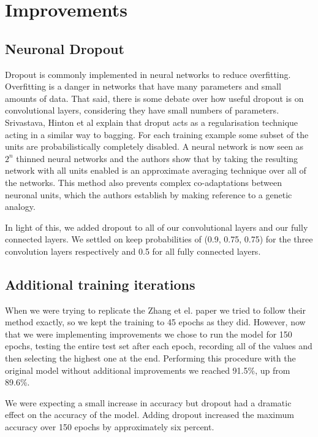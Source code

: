 \documentclass[conference]{IEEEtran}
\begin{document}
\section{Improvements}

\subsection{Neuronal Dropout}

Dropout is commonly implemented in neural networks to reduce overfitting. Overfitting is a danger in networks that have many parameters and small amounts of data. That said, there is some debate over how useful dropout is on convolutional layers, considering they have small numbers of parameters. Srivastava, Hinton et al\cite{Dropout_Paper} explain that droput acts as a regularisation technique acting in a similar way to bagging. For each training example some subset of the units are probabilistically completely disabled. A neural network is now seen as $2^{n}$ thinned neural networks and the authors show that by taking the resulting network with all units enabled is an approximate averaging technique over all of the networks. This method also prevents complex co-adaptations between neuronal units, which the authors establish by making reference to a genetic analogy.

In light of this, we added dropout to all of our convolutional layers and our fully connected layers. We settled on keep probabilities of (0.9, 0.75, 0.75) for the three convolution layers respectively and 0.5 for all fully connected layers.

\subsection{Additional training iterations}

When we were trying to replicate the Zhang et el. paper we tried to follow their method exactly, so we kept the training to 45 epochs as they did. However, now that we were implementing improvements we chose to run the model for 150 epochs, testing the entire test set after each epoch, recording all of the values and then selecting the highest one at the end. Performing this procedure with the original model without additional improvements we reached 91.5\%, up from 89.6\%.

We were expecting a small increase in accuracy but dropout had a dramatic effect on the accuracy of the model. Adding dropout increased the maximum accuracy over 150 epochs by approximately six percent.
\end{document}
